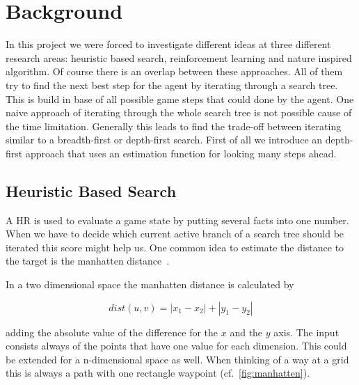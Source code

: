 

\section{Background} 
\label{sec:back}

In this project we were forced to investigate different ideas at three different research areas: heuristic based search, reinforcement learning and nature inspired algorithm. 
Of course there is an overlap between these approaches. All of them try to find the next best step for the agent by iterating through a search tree. This is build in base of all possible game steps that could done by the agent.
One naive approach of iterating through the whole search tree is not possible cause of the time limitation.
Generally this leads to find the trade-off between iterating similar to a breadth-first or depth-first search.
First of all we introduce an depth-first approach that uses an estimation function for looking many steps ahead.


\subsection{Heuristic Based Search} 

A \ac{HR} is used to evaluate a game state by putting several facts into one number. When we have to decide which current active branch of a search tree should be iterated this score might help us. 
One common idea to estimate the distance to the target is the manhatten distance~\cite{distance_metrics}. 

In a two dimensional space the manhatten distance is calculated by

\begin{equation}
dist(u,v) = |x_{1} - x_{2}| + |y_{1} - y_{2}|
\end{equation}

adding the absolute value of the difference for the $x$ and the $y$ axis. The input consists always of the points that have one value for each dimension. This could be extended for a n-dimensional space as well. When thinking of a way at a grid this is always a path with one rectangle waypoint (cf.~\cref{fig:manhatten}).

